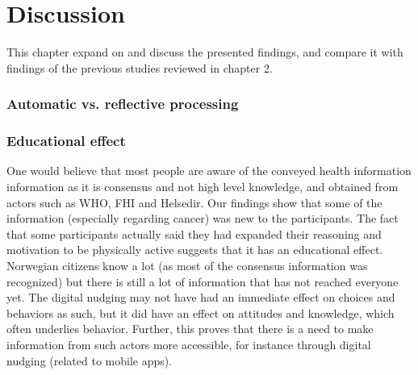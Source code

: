 \chapter{Discussion}
This chapter expand on and discuss the presented findings, and compare it with findings of the previous studies reviewed in chapter 2. 



\subsection{Automatic vs. reflective processing}

\subsection{Educational effect}
One would believe that most people are aware of the conveyed health information information as it is consensus and not high level knowledge, and obtained from actors such as WHO, FHI and Helsedir. Our findings show that some of the information (especially regarding cancer) was new to the participants. The fact that some participants actually said they had expanded their reasoning and motivation to be physically active suggests that it has an educational effect. Norwegian citizens know a lot (as most of the consensus information was recognized) but there is still a lot of information that has not reached everyone yet. The digital nudging may not have had an immediate effect on choices and behaviors as such, but it did have an effect on attitudes and knowledge, which often underlies behavior. Further, this proves that there is a need to make information from such actors more accessible, for instance through digital nudging (related to mobile apps). 

